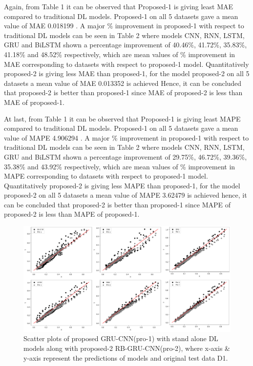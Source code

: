 \documentclass[a4paper, fleqn]{cas-sc}
\begin{document}
Again,  from Table 1 it can be observed that  Proposed-1 is giving least MAE compared to traditional DL models. Proposed-1 on all 5 datasets gave a mean value of MAE 0.018199 . A major \% improvement in proposed-1 with respect to traditional DL models can be seen in Table 2 where models CNN,  RNN,  LSTM,  GRU and BiLSTM shown a percentage improvement of 40.46\%,  41.72\%,  35.83\%,  41.18\% and 48.52\% respectively,  which are mean values of \% improvement in MAE corresponding to datasets with respect to proposed-1 model. Quantitatively proposed-2 is giving less MAE than proposed-1,  for the model proposed-2 on all 5 datasets a mean value of MAE 0.013352 is achieved Hence,  it can be concluded that proposed-2 is better than proposed-1 since MAE of proposed-2 is less than MAE of proposed-1.

At last,  from Table 1 it can be observed that  Proposed-1 is giving least MAPE compared to traditional DL models. Proposed-1 on all 5 datasets gave a mean value of MAPE 4.906294 . A major \% improvement in proposed-1 with respect to traditional DL models can be seen in Table 2 where models CNN,  RNN,  LSTM,  GRU and BiLSTM shown a percentage improvement of 29.75\%,  46.72\%,  39.36\%,  35.38\% and 43.92\% respectively,  which are mean values of \% improvement in MAPE corresponding to datasets with respect to proposed-1 model. Quantitatively proposed-2 is giving less MAPE than proposed-1,  for the model proposed-2 on all 5 datasets a mean value of MAPE 3.62479 is achieved hence,  it can be concluded that proposed-2 is better than proposed-1 since MAPE of proposed-2 is less than MAPE of proposed-1.
 \begin{figure}[h!]
   \centering
   \includegraphics[scale=.5]{d1_sp.drawio.png}
    \caption{Scatter plots of proposed GRU-CNN(pro-1) with stand alone DL models along with proposed-2 RB-GRU-CNN(pro-2), where x-axis \& y-axis represent the predictions of models and original test data D1.}
    \label{Fig:6}
   \end{figure}
\end{document}
